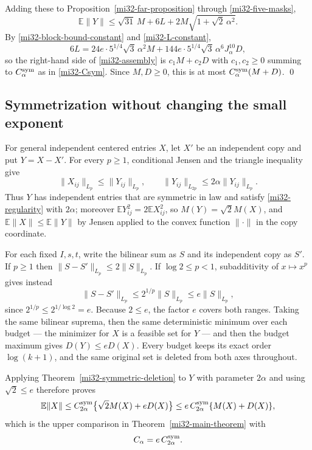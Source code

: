 \documentclass[11pt]{article}
\theoremstyle{definition}
\theoremstyle{remark}
\newcommand{\E}{\mathbb E}
\newcommand{\norm}[1]{\lVert#1\rVert}
\begin{document}
Adding these to Proposition~\ref{mi32-far-proposition} through
\eqref{mi32-five-masks},
\begin{equation}\label{mi32-assembly}
 \E\norm{Y}\le\sqrt{31}\,M+6L+2M\sqrt{1+\sqrt2\,\alpha^2}.
\end{equation}
By \eqref{mi32-block-bound-constant} and \eqref{mi32-L-constant},
\[
 6L=24e\cdot5^{1/4}\sqrt3\,\alpha^2M
      +144e\cdot5^{1/4}\sqrt3\,\alpha^6J_\alpha^{10}D,
\]
so the right-hand side of \eqref{mi32-assembly} is
$c_1M+c_2D$ with $c_1,c_2\ge0$ summing to $C^{\rm sym}_\alpha$ as in
\eqref{mi32-Csym}. Since $M,D\ge0$, this is at most
$C^{\rm sym}_\alpha(M+D)$. \qed

\subsection{Symmetrization without changing the small exponent}
\label{mi32-symmetrization}

For general independent centered entries $X$, let $X'$ be an
independent copy and put $Y=X-X'$. For every $p\ge1$, conditional
Jensen and the triangle inequality give
\[
 \norm{X_{ij}}_{L_p}\le\norm{Y_{ij}}_{L_p},\qquad
 \norm{Y_{ij}}_{L_{2p}}\le2\alpha\norm{Y_{ij}}_{L_p}.
\]
Thus $Y$ has independent entries that are symmetric in law and satisfy
\eqref{mi32-regularity} with $2\alpha$; moreover
$\E Y_{ij}^2=2\E X_{ij}^2$, so $M(Y)=\sqrt2M(X)$, and
$\E\norm{X}\le\E\norm{Y}$ by Jensen applied to the convex function
$\norm{\cdot}$ in the copy coordinate.

For each fixed $I,s,t$, write the bilinear sum as $S$ and its
independent copy as $S'$. If $p\ge1$ then
$\norm{S-S'}_{L_p}\le2\norm{S}_{L_p}$. If $\log2\le p<1$,
subadditivity of $x\mapsto x^p$ gives instead
\[
 \norm{S-S'}_{L_p}\le2^{1/p}\norm{S}_{L_p}\le e\norm{S}_{L_p},
\]
since $2^{1/p}\le2^{1/\log2}=e$. Because $2\le e$, the factor $e$ covers
both ranges. Taking the same bilinear suprema, then the same
deterministic minimum over each budget --- the minimizer for $X$ is a
feasible set for $Y$ --- and then the budget maximum gives
$D(Y)\le eD(X)$. Every budget keeps its exact order $\log(k+1)$, and the
same original set is deleted from both axes throughout.

Applying Theorem~\ref{mi32-symmetric-deletion} to $Y$ with parameter
$2\alpha$ and using $\sqrt2\le e$ therefore proves
\begin{equation}\label{mi32-reduction-final-upper}
 \E\norm{X}\le C^{\rm sym}_{2\alpha}
     \bigl\{\sqrt2M(X)+eD(X)\bigr\}
 \le e\,C^{\rm sym}_{2\alpha}\{M(X)+D(X)\},
\end{equation}
which is the upper comparison in Theorem~\ref{mi32-main-theorem} with
\begin{equation}\label{mi32-final-constant}
 C_\alpha=e\,C^{\rm sym}_{2\alpha}.
\end{equation}
\end{document}

